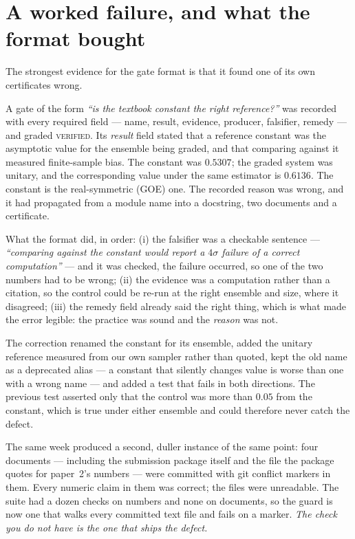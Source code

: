 \documentclass[11pt]{article}
\begin{document}
\section{A worked failure, and what the format bought}

The strongest evidence for the gate format is that it found one of its own certificates wrong.

A gate of the form \emph{``is the textbook constant the right reference?''} was recorded with every
required field --- name, result, evidence, producer, falsifier, remedy --- and graded \textsc{verified}.
Its \emph{result} field stated that a reference constant was the asymptotic value for the ensemble being
graded, and that comparing against it measured finite-sample bias. The constant was $0.5307$; the graded
system was unitary, and the corresponding value under the same estimator is $0.6136$. The constant is
the real-symmetric (GOE) one. The recorded reason was wrong, and it had propagated from a module name
into a docstring, two documents and a certificate.

What the format did, in order: (i) the falsifier was a checkable sentence --- \emph{``comparing against
the constant would report a $4\sigma$ failure of a correct computation''} --- and it was checked, the
failure occurred, so one of the two numbers had to be wrong; (ii) the evidence was a computation rather
than a citation, so the control could be re-run at the right ensemble and size, where it disagreed;
(iii) the remedy field already said the right thing, which is what made the error legible: the practice
was sound and the \emph{reason} was not.

The correction renamed the constant for its ensemble, added the unitary reference measured from our own
sampler rather than quoted, kept the old name as a deprecated alias --- a constant that silently changes
value is worse than one with a wrong name --- and added a test that fails in both directions. The previous
test asserted only that the control was more than $0.05$ from the constant, which is true under either
ensemble and could therefore never catch the defect.

The same week produced a second, duller instance of the same point: four documents --- including the
submission package itself and the file the package quotes for paper~2's numbers --- were committed with git
conflict markers in them. Every numeric claim in them was correct; the files were unreadable. The suite had
a dozen checks on numbers and none on documents, so the guard is now one that walks every committed text
file and fails on a marker. \emph{The check you do not have is the one that ships the defect.}
\end{document}
